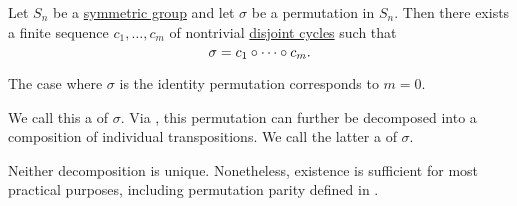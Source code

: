 \begin{proposition}\label{thm:permutation_decomposition_existence}
  Let \( S_n \) be a \hyperref[def:symmetric_group]{symmetric group} and let \( \sigma \) be a permutation in \( S_n \). Then there exists a finite sequence \( c_1, \ldots, c_m \) of nontrivial \hyperref[def:symmetric_group/disjoint_cycle]{disjoint cycles} such that
  \begin{equation*}
    \sigma = c_1 \bincirc \cdots \bincirc c_m.
  \end{equation*}

  The case where \( \sigma \) is the identity permutation corresponds to \( m = 0 \).

  We call this a  of \( \sigma \). Via , this permutation can further be decomposed into a composition of individual transpositions. We call the latter a  of \( \sigma \).

  Neither decomposition is unique. Nonetheless, existence is sufficient for most practical purposes, including permutation parity defined in .
\end{proposition}
